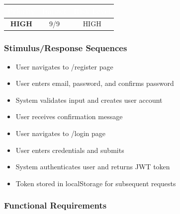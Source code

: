 \documentclass[12pt,a4paper]{article}
\begin{document}
\vspace{0.3em}
\begin{center}
\begin{tabular}{|c|c|c|}
\hline
\rowcolor{accentblue}
\textcolor{white}{\textbf{Priority}} & \textcolor{white}{\textbf{Impact}} & \textcolor{white}{\textbf{Risk Level}} \\
\hline
\rowcolor{lightgray}
\textbf{\textcolor{deepblue}{HIGH}} & 9/9 & HIGH \\
\hline
\end{tabular}
\end{center}

\subsubsection{Stimulus/Response Sequences}
\begin{itemize}
    \item User navigates to /register page
    \item User enters email, password, and confirms password
    \item System validates input and creates user account
    \item User receives confirmation message
    \item User navigates to /login page
    \item User enters credentials and submits
    \item System authenticates user and returns JWT token
    \item Token stored in localStorage for subsequent requests
\end{itemize}

\subsubsection{Functional Requirements}
\end{document}
